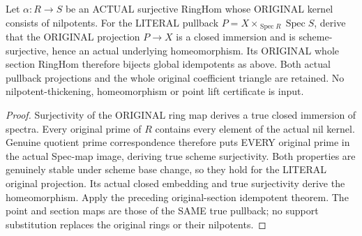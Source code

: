 \begin{theorem}
\label{scheme:actual-original-nil-thickening-global-idempotents}
\leanok
{}
Let $\alpha:R\to S$ be an ACTUAL surjective RingHom whose ORIGINAL kernel
consists of nilpotents. For the LITERAL pullback
$P=X\times_{\operatorname{Spec}R}\operatorname{Spec}S$, derive that the
ORIGINAL projection $P\to X$ is a closed immersion and is
scheme-surjective, hence an actual underlying homeomorphism. Its ORIGINAL
whole section RingHom therefore bijects global idempotents as above.
Both actual pullback projections and the whole original coefficient
triangle are retained. No nilpotent-thickening, homeomorphism or point
lift certificate is input.
\end{theorem}
\begin{proof}
Surjectivity of the ORIGINAL ring map derives a true closed immersion of
spectra. Every original prime of $R$ contains every element of the actual
nil kernel. Genuine quotient prime correspondence therefore puts EVERY
original prime in the actual Spec-map image, deriving true scheme
surjectivity. Both properties are genuinely stable under scheme base
change, so they hold for the LITERAL original projection. Its actual
closed embedding and true surjectivity derive the homeomorphism. Apply
the preceding original-section idempotent theorem. The point and section
maps are those of the SAME true pullback; no support substitution replaces
the original rings or their nilpotents.
\end{proof}

